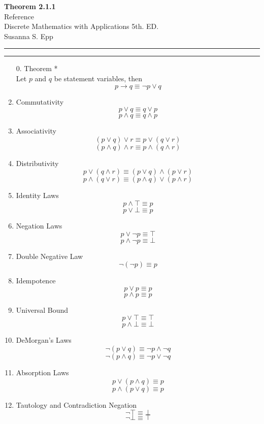\documentclass[12pt]{article}
\newif\ifshow
\newcommand{\T}[0]{\top}
\newcommand{\F}[0]{\bot}
\begin{document}
\begin{center}
\ifshow
  \textbf{\Large Formula Sheet 2.1.1.}\\
\else
  \textbf{\Large Theorem 2.1.1}\\
\fi
Reference\\
Discrete Mathematics with Applications 5th. ED. \\
Susanna S. Epp\\
\end{center}

\hrule

\vspace{0.2cm}

\hrule

\vspace{0.5cm}



\begin{enumerate}

    \item[0.] Theorem *\\
    Let $p$ and $q$ be statement variables, then
        \[
        p \rightarrow q \equiv \neg p \vee q
        \]

    \item Commutativity
        \[
        p \vee q \equiv q \vee p
        \]
        \[
        p \wedge q \equiv q \wedge p
        \]
    \item Associativity
        \[
        (p \vee q) \vee r \equiv p \vee (q\vee r)
        \]
        \[
        (p \wedge q) \wedge r \equiv p \wedge (q\wedge r)
        \]
    \item Distributivity
        \[
        p \vee (q \wedge r) \equiv (p \vee q) \wedge (p \vee r)
        \]
        \[
        p \wedge (q \vee r) \equiv (p \wedge q) \vee (p \wedge r)
        \]
    \item Identity Laws
        \[
        p \wedge \T \equiv p
        \]
        \[
        p \vee \F \equiv p
        \]
    \item Negation Laws
        \[
        p \vee \neg p \equiv \T
        \]
        \[
        p \wedge \neg p \equiv \F
        \]
    \item Double Negative Law
        \[
        \neg (\neg p) \equiv p
        \]
    \item Idempotence
        \[
        p \vee p \equiv p
        \]
        \[
        p \wedge p \equiv p
        \]
    \item Universal Bound
        \[
        p \vee \T \equiv \T
        \]
        \[
        p \wedge \F \equiv \F
        \]
    \item DeMorgan's Laws
        \[
        \neg (p \vee q) \equiv \neg p \wedge \neg q
        \]
        \[
        \neg (p \wedge q) \equiv \neg p \vee \neg q
        \]
    \item Absorption Laws
        \[
        p \vee (p \wedge q) \equiv p
        \]
        \[
        p \wedge (p \vee q) \equiv p
        \]
    \item Tautology and Contradiction Negation
        \[
        \neg \T \equiv \F
        \]
        \[
        \neg \F \equiv \T
        \]

\end{enumerate}
\end{document}
